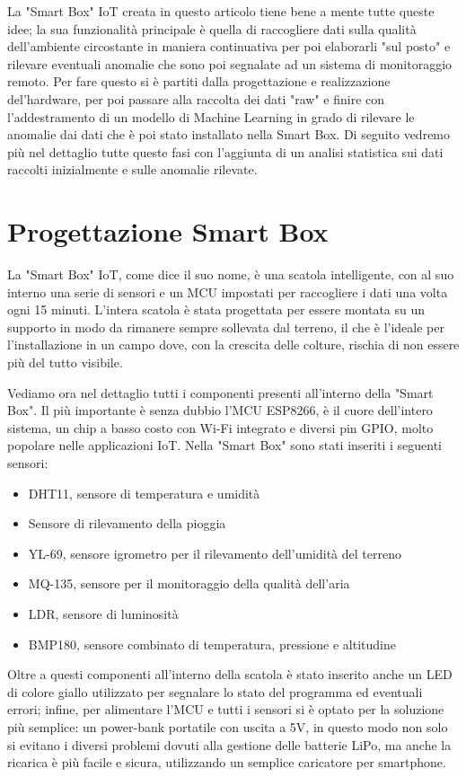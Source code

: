 \documentclass[fleqn, 12pt]{SelfArx}
\begin{document}
La "Smart Box" IoT creata in questo articolo tiene bene a mente tutte queste idee; la sua funzionalità principale è quella di raccogliere dati sulla qualità dell'ambiente circostante in maniera continuativa per poi 
elaborarli "sul posto" e rilevare eventuali anomalie che sono poi segnalate ad un sistema di monitoraggio remoto. Per fare questo si è partiti dalla progettazione e realizzazione del'hardware, per poi passare alla raccolta
dei dati "raw" e finire con l'addestramento di un modello di Machine Learning in grado di rilevare le anomalie dai dati che è poi stato installato nella Smart Box.
Di seguito vedremo più nel dettaglio tutte queste fasi con l'aggiunta di un analisi statistica sui dati raccolti inizialmente e sulle anomalie rilevate.

\section{Progettazione Smart Box}

La "Smart Box" IoT, come dice il suo nome, è una scatola intelligente, con al suo interno una serie di sensori e un MCU impostati per raccogliere i dati una volta ogni 15 minuti. L'intera scatola è stata progettata 
per essere montata su un supporto in modo da rimanere sempre sollevata dal terreno, il che è l'ideale per l'installazione in un campo dove, con la crescita delle colture, rischia di non essere più del tutto visibile.

Vediamo ora nel dettaglio tutti i componenti presenti all'interno della "Smart Box". Il più importante è senza dubbio l'MCU ESP8266, è il cuore dell'intero sistema, un chip a basso costo con Wi-Fi integrato e diversi pin
GPIO, molto popolare nelle applicazioni IoT.
Nella "Smart Box" sono stati inseriti i seguenti sensori:

\begin{itemize}
\item DHT11, sensore di temperatura e umidità
\item Sensore di rilevamento della pioggia 
\item YL-69, sensore igrometro per il rilevamento dell'umidità del terreno
\item MQ-135, sensore per il monitoraggio della qualità dell'aria
\item LDR, sensore di luminosità 
\item BMP180, sensore combinato di temperatura, pressione e altitudine
\end{itemize}

Oltre a questi componenti all'interno della scatola è stato inserito anche un LED di colore giallo utilizzato per segnalare lo stato del programma ed eventuali errori; infine, per alimentare l'MCU e tutti i sensori si 
è optato per la soluzione più semplice: un power-bank portatile con uscita a 5V, in questo modo non solo si evitano i diversi problemi dovuti alla gestione delle batterie LiPo, ma anche la ricarica è più 
facile e sicura, utilizzando un semplice caricatore per smartphone.
\end{document}

